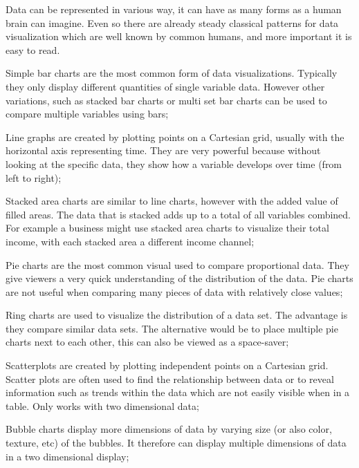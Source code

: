 Data can be represented in various way, it can have as many forms as a human brain can imagine. Even so there are already steady classical patterns for data visualization which are well known by common humans, and more important it is easy to read.

\begin{description}
    \item Simple bar charts are the most common form of data visualizations. Typically they only display different quantities of single variable data. However other variations, such as stacked bar charts or multi set bar charts can be used to compare multiple variables using bars;

    \item Line graphs are created by plotting points on a Cartesian grid, usually with the horizontal axis representing time. They are very powerful because without looking at the specific data, they show how a variable develops over time (from left to right);

    \item Stacked area charts are similar to line charts, however with the added value of filled areas. The data that is stacked adds up to a total of all variables combined. For example a business might use stacked area charts to visualize their total income, with each stacked area a different income channel;

    \item Pie charts are the most common visual used to compare proportional data. They give viewers a very quick understanding of the distribution of the data. Pie charts are not useful when comparing many pieces of data with relatively close values;


    \item Ring charts are used to visualize the distribution of a data set. The advantage is they compare similar data sets. The alternative would be to place multiple pie charts next to each other, this can also be viewed as a space-saver;

    \item Scatterplots are created by plotting independent points on a Cartesian grid. Scatter plots are often used to find the relationship between data or to reveal information such as trends within the data which are not easily visible when in a table. Only works with two dimensional data;

    \item Bubble charts display more dimensions of data by varying size (or also color, texture, etc) of the bubbles. It therefore can display multiple dimensions of data in a two dimensional display;


\end{description}
